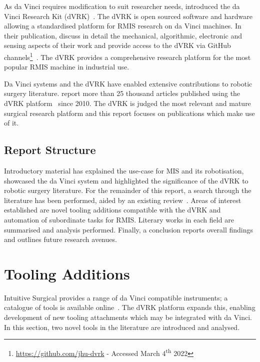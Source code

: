 \documentclass[english]{sobraep}
\begin{document}
\par{As da Vinci requires modification to suit researcher needs,  \citeauthor{dvrk} introduced the da Vinci Research Kit (dVRK)~\cite{dvrk}. The dVRK is open sourced software and hardware allowing a standardised platform for RMIS research on da Vinci machines. In their publication, \citeauthor{dvrk} discuss in detail the mechanical, algorithmic, electronic and sensing aspects of their work and provide access to the dVRK via GitHub channels\footnote{\url{https://github.com/jhu-dvrk} - Accessed March 4\textsuperscript{th} 2022}~\cite{dvrk}. The dVRK provides a comprehensive research platform for the most popular RMIS machine in industrial use.}

\par{Da Vinci systems and the dVRK have enabled extensive contributions to robotic surgery literature. \citeauthor{10-years-dvrk} report more than 25 thousand articles published using the dVRK platform~\cite{10-years-dvrk} since 2010. The dVRK is judged the most relevant and mature surgical research platform and this report focuses on publications which make use of it. }


\subsection{Report Structure}
\par{Introductory material has explained the use-case for MIS and its robotisation, showcased the da Vinci system and highlighted the significance of the dVRK to robotic surgery literature. For the remainder of this report, a search through the literature has been performed, aided by an existing review~\cite{10-years-dvrk}. Areas of interest established are novel tooling additions compatible with the dVRK and automation of subordinate tasks for RMIS. Literary works in each field are summarised and analysis performed. Finally, a conclusion reports overall findings and outlines future research avenues. }

\section{Tooling Additions}\label{sec:mechanical}
\par{Intuitive Surgical provides a range of da Vinci compatible instruments; a catalogue of tools is available online~\cite{da-vinci-catalogue}. 
The dVRK platform expands this, enabling development of new tooling attachments which may be integrated with da Vinci. In this section, two novel tools in the literature are introduced and analysed.} 
\end{document}
